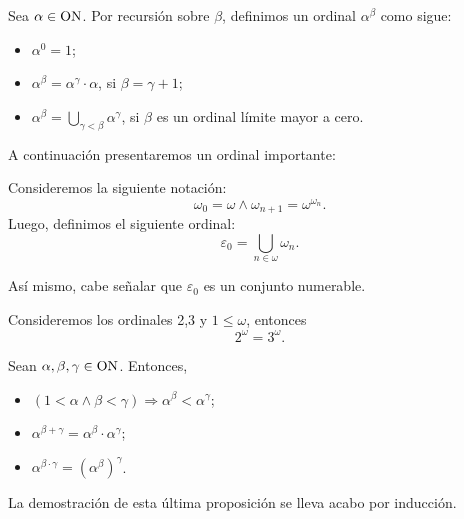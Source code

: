 \begin{defn}\label{d34}
    Sea $\alpha\in\text{ON}$. Por recursión sobre $\beta$, definimos un ordinal $\alpha^\beta$ como sigue:
    \begin{itemize}
        \item $\alpha^0=1$;
        \item $\alpha^\beta=\alpha^\gamma\cdot\alpha$, si $\beta=\gamma+1$;
        \item $\alpha^\beta=\bigcup_{\gamma<\beta}\alpha^\gamma$, si $\beta$ es un ordinal límite mayor a cero.
    \end{itemize}
\end{defn}
A continuación presentaremos un ordinal importante:
\begin{defn}\label{ex28}
    Consideremos la siguiente notación:
    \[\omega_0=\omega\land\omega_{n+1}=\omega^{\omega_{n}}.\]
    Luego, definimos el siguiente ordinal:
    \[\varepsilon_0=\bigcup_{n\in\omega}\omega_{n}.\]
\end{defn}
Así mismo, cabe señalar que $\varepsilon_0$ es un conjunto numerable.
\begin{ex}\label{ex29}
    Consideremos los ordinales 2,3 y $1\leq\omega$, entonces 
    \[2^\omega=3^\omega.\]
\end{ex}
\begin{prop}\label{ex30}
    Sean $\alpha,\beta,\gamma\in\text{ON}$. Entonces,
    \begin{itemize}
    \item $(1<\alpha\land\beta<\gamma)\Longrightarrow\alpha^\beta<\alpha^\gamma$;
    \item $\alpha^{\beta+\gamma}=\alpha^\beta\cdot\alpha^\gamma$;
    \item $\alpha^{\beta\cdot\gamma}={(\alpha^\beta)}^\gamma$.
    \end{itemize}
\end{prop}
La demostración de esta última proposición se lleva acabo por inducción.
